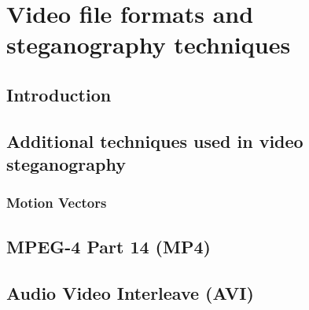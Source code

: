 
\chapter{Video file formats and steganography techniques}

\section{Introduction}

\section{Additional techniques used in video steganography}
\subsection{Motion Vectors}

\section{MPEG-4 Part 14 (MP4)}

\section{Audio Video Interleave (AVI)}